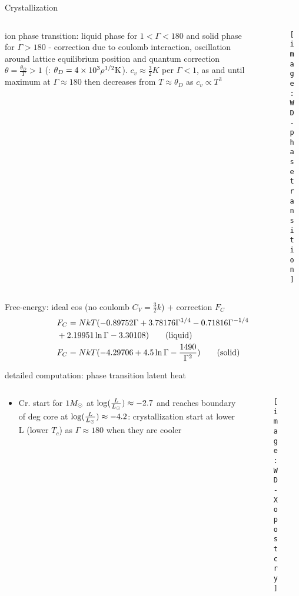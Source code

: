 \begin{frame}{Crystallization}
\begin{columns}[T]
	\begin{column}{0.5\textwidth}
ion phase transition: liquid phase for $1<\Gamma<180$ and solid phase for $\Gamma>180$ - correction due to coulomb interaction, oscillation around lattice equilibrium position and quantum correction $\theta=\frac{\theta_D}{T}>1$ (: $\theta_D=\num{4e3}\rho^{1/2}\si{\kelvin}$). $c_v\approx\frac{3}{2}K$ per $\Gamma<1$, as  \xaumenta{\Gamma} and  until maximum at $\Gamma\approx180$ then decreases from $T\approx\theta_D$ as $c_v\propto T^3$
	\end{column}
	\begin{column}{0.5\textwidth}
	\begin{figure}[!ht]
	\texttt{[image: WD-phasetransition]}\label{fig:WD-phasetransition}
	\end{figure}
\end{column}\end{columns}
Free-energy: ideal eos (no coulomb $C_V=\frac{3}{2}k$) + correction $F_C$
\begin{align*}
&F_C=NkT(-0.89752\Gamma+3.78176\Gamma^{1/4}-0.71816\Gamma^{-1/4}\\
&+2.19951\ln\Gamma-3.30108)\tag{liquid}\\
&F_C=NkT(-4.29706+4.5\ln\Gamma-\frac{1490}{\Gamma^2})\tag{solid}
\end{align*}
\end{frame}

\begin{frame}{detailed computation: phase transition latent heat}
\begin{columns}[T]
	\begin{column}{0.45\textwidth}
		\begin{itemize}
		\item Cr. start for $1M_{\odot}$ at $\log(\frac{L}{L_{\odot}})\approx-2.7$ and reaches boundary of deg core at $\log(\frac{L}{L_{\odot}})\approx-4.2$:  crystallization start at lower L (lower $T_c$) as  $\Gamma\approx180$ when they are cooler
		\end{itemize}
	\end{column}
	\begin{column}{0.5\textwidth}
		\begin{figure}[!ht]
		\texttt{[image: WD-Xopostcry]}\label{fig:WD-Xopostcry}
		\end{figure}
	\end{column}\end{columns}
\end{frame}


